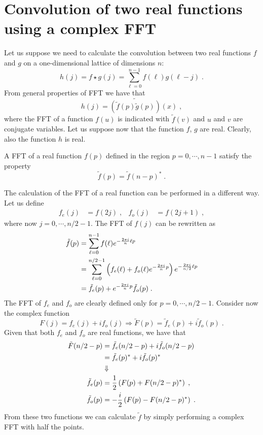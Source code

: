 \documentclass[12pt]{article}
\begin{document}

\section*{Convolution of two real functions using a complex FFT}

Let us suppose we need to calculate the convolution between two real functions
$f$ and $g$ on a one-dimensional lattice of dimensions $n$:
\begin{equation}
h(j)=f \star g (j)=
\sum_{\ell=0}^{n-1} f(\ell) g(\ell-j)\;.
\end{equation}
From general properties of FFT we have that
\begin{equation}
h(j)=\widetilde{(\tilde f(p) \tilde g(p))}(x)\;,
\end{equation}
where the FFT of a function $f(u)$ is indicated with $\tilde f(v)$ and
$u$ and $v$ are conjugate variables.
Let us suppose now that the function $f$, $g$ are real.
Clearly, also the function $h$ is real.

A FFT of a real function $f(p)$ defined in the region $p=0,\cdots,n-1$ satisfy the property
\begin{equation}
\tilde f(p)= \tilde f(n-p)^*\;.
\end{equation}

The calculation of the FFT of a real function can be performed in a different way.
Let us define
\begin{align}
f_e(j)&= f(2 j)\;, & f_o(j)&= f(2 j+1)\;,
\end{align}
where now $j=0,\cdots,n/2-1$.
The FFT of $f(j)$ can be rewritten as
\begin{align}
\tilde f(p)&= \sum_{\ell=0}^{n-1} f(\ell) e^{-\frac{2\pi i}{n}\ell p }\notag\\
&=\sum_{\ell=0}^{n/2-1} \left(f_e(\ell) + f_o(\ell) e^{-\frac{2\pi i}{n}p} \right)e^{-\frac{2\pi i}{n/2}\ell p }\\
&=\tilde f_e(p) +  e^{-\frac{2\pi i}{n}p} \tilde f_o (p)\;.\notag
\end{align}
The FFT of $f_e$ and $f_o$ are clearly defined only for $p=0,\cdots,n/2-1$.
Consider now the complex function
\begin{equation}
F(j)=f_e(j)+if_o(j) \Longrightarrow \tilde F(p) = \tilde f_e (p) +i \tilde f_o (p)\;.
\end{equation}
Given that both $f_e$ and $f_o$ are real functions, we have that
\begin{align}
\tilde F(n/2 -p) &= \tilde f_e (n/2 - p) +i \tilde f_o (n/2 - p)\notag\\
&= \tilde f_e (p)^* +i \tilde f_o (p)^*\notag\\
& \Downarrow\\
\tilde f_e (p) &= \frac{1}{2} \left(  F(p) +  F(n/2 -p)^*\right)\;, \\
\tilde f_o (p) &= -\frac{i}{2} \left(  F(p) -  F(n/2 -p)^*\right)\notag \;.
\end{align} 
From these two functions we can calculate $\tilde f$ by simply performing a complex FFT with half the points.
\end{document}
